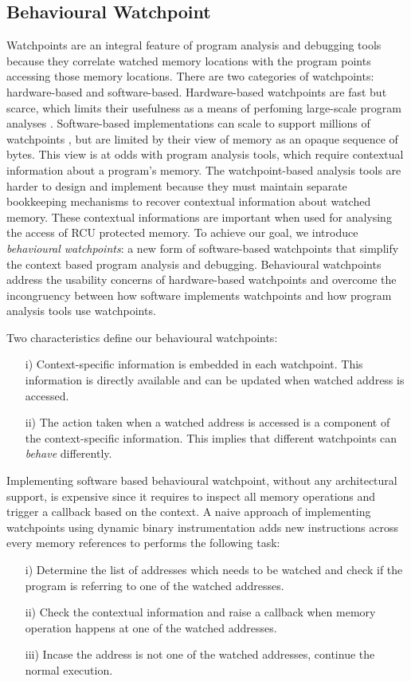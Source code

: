 \subsection{Behavioural Watchpoint}
Watchpoints are an integral feature of program analysis and debugging tools because they correlate watched memory locations with the program points accessing those memory locations. There are two categories of watchpoints: hardware-based and software-based. Hardware-based watchpoints are fast but scarce, which limits their usefulness as a means of perfoming large-scale program analyses \cite{UnlimitedWatchpoints}. Software-based implementations can scale to support millions of watchpoints \cite{Zhao:2008}, but are limited by their view of memory as an opaque sequence of bytes. This view is at odds with program analysis tools, which require contextual information about a program's memory. The watchpoint-based analysis tools are harder to design and implement because they must maintain separate bookkeeping mechanisms to recover contextual information about watched memory. These contextual informations are important when used for analysing the access of RCU protected memory. To achieve our goal, we introduce \emph{behavioural watchpoints}: a new form of software-based watchpoints that simplify the context based program analysis and debugging.  Behavioural watchpoints address the usability concerns of hardware-based watchpoints and overcome the incongruency between how software implements watchpoints and how program analysis tools use watchpoints.

Two characteristics define our behavioural watchpoints:
\begin{enumerate}
	\item[i)] Context-specific information is embedded in each watchpoint. This information is directly available and can be updated when watched address is accessed.
	\item[ii)] The action taken when a watched address is accessed is a component of the context-specific information. This implies that different watchpoints can \emph{behave} differently.
\end{enumerate} 

Implementing software based behavioural watchpoint, without any architectural support, is expensive since it requires to inspect all memory operations and trigger a callback based on the context. A naive approach of implementing watchpoints using dynamic binary instrumentation adds new instructions across every memory references to performs the following task: 
\begin{enumerate}
	\item[i)] Determine the list of addresses which needs to be watched and check if the program is referring to one of the watched addresses.  
	\item[ii)] Check the contextual information and raise a callback when memory operation happens at one of the watched addresses.
	\item[iii)] Incase the address is not one of the watched addresses, continue the normal execution.
\end{enumerate} 
 
